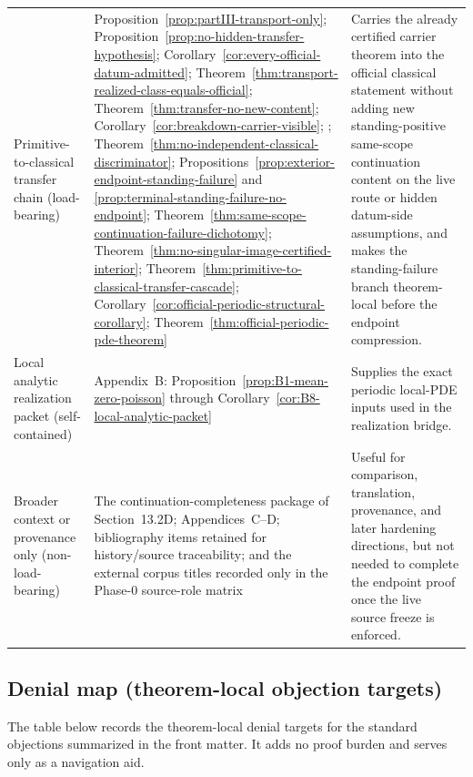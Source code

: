 \begin{proposition}
\begin{center}
\begin{tabularx}{0.98\textwidth}{@{}L{0.22\textwidth}L{0.39\textwidth}Y@{}}
Primitive-to-classical transfer chain (load-bearing) & Proposition~\ref{prop:partIII-transport-only}; Proposition~\ref{prop:no-hidden-transfer-hypothesis}; Corollary~\ref{cor:every-official-datum-admitted}; Theorem~\ref{thm:transport-realized-class-equals-official}; Theorem~\ref{thm:transfer-no-new-content}; Corollary~\ref{cor:breakdown-carrier-visible}; \HorizonDetectabilityRef{}; Theorem~\ref{thm:no-independent-classical-discriminator}; Propositions~\ref{prop:exterior-endpoint-standing-failure} and \ref{prop:terminal-standing-failure-no-endpoint}; Theorem~\ref{thm:same-scope-continuation-failure-dichotomy}; Theorem~\ref{thm:no-singular-image-certified-interior}; Theorem~\ref{thm:primitive-to-classical-transfer-cascade}; Corollary~\ref{cor:official-periodic-structural-corollary}; Theorem~\ref{thm:official-periodic-pde-theorem} & Carries the already certified carrier theorem into the official classical statement without adding new standing-positive same-scope continuation content on the live route or hidden datum-side assumptions, and makes the standing-failure branch theorem-local before the endpoint compression.\\
Local analytic realization packet (self-contained) & Appendix~B: Proposition~\ref{prop:B1-mean-zero-poisson} through Corollary~\ref{cor:B8-local-analytic-packet} & Supplies the exact periodic local-PDE inputs used in the realization bridge.\\
Broader context or provenance only (non-load-bearing) & The continuation-completeness package of Section~13.2D; Appendices~C--D; bibliography items retained for history/source traceability; and the external corpus titles recorded only in the Phase-0 source-role matrix & Useful for comparison, translation, provenance, and later hardening directions, but not needed to complete the endpoint proof once the live source freeze is enforced.\\
\bottomrule
\end{tabularx}
\end{center}
\end{proposition}

\subsection*{Denial map (theorem-local objection targets)}
The table below records the theorem-local denial targets for the standard objections summarized in the front matter. It adds no proof burden and serves only as a navigation aid.

